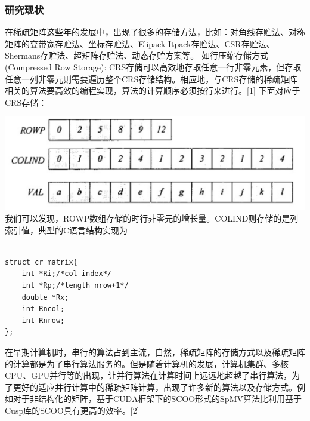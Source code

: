 \documentclass{article}
\begin{document}
\subsubsection{研究现状}
在稀疏矩阵这些年的发展中，出现了很多的存储方法，比如：对角线存贮法、对称矩阵的变带宽存贮法、坐标存贮法、Elipack-Itpack存贮法、CSR存贮法、Shermans存贮法、超矩阵存贮法、动态存贮方案等。\newline
如行压缩存储方式(Compressed Row Storage):
CRS存储可以高效地存取任意一行非零元素，但存取任意一列非零元则需要遍历整个CRS存储结构。相应地，与CRS存储的稀疏矩阵相关的算法要高效的编程实现，算法的计算顺序必须按行来进行。[1]
下面对应于CRS存储：
\newline\newline\newline\newline\newline\newline\newline\newline

\includegraphics[scale=0.25]{crs.png} \newline
我们可以发现，ROWP数组存储的时行非零元的增长量。COLIND则存储的是列索引值，典型的C语言结构实现为\newline
\begin{lstlisting}

struct cr_matrix{ 
	int *Ri;/*col index*/ 
	int *Rp;/*length nrow+1*/ 
	double *Rx; 
	int Rncol;
	int Rnrow;
};

\end{lstlisting}
在早期计算机时，串行的算法占到主流，自然，稀疏矩阵的存储方式以及稀疏矩阵的计算都是为了串行算法服务的。但是随着计算机的发展，计算机集群、多核CPU、GPU并行等的出现，让并行算法在计算时间上远远地超越了串行算法，为了更好的适应并行计算中的稀疏矩阵计算，出现了许多新的算法以及存储方式。例如对于非结构化的矩阵，基于CUDA框架下的SCOO形式的SpMV算法比利用基于Cusp库的SCOO具有更高的效率。[2]
\newline
\end{document}
